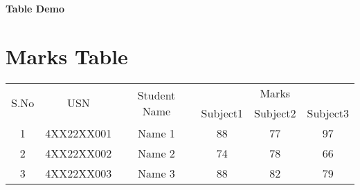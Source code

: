 \documentclass[10pt,a4paper]{article}
\begin{document}
\begin{center}
\begin{Large}
\textbf{Table Demo}
\end{Large}
\end{center}
\section*{Marks Table}
\begin{tabular}{|c|c|c|c|c|c|}
\hline 
\multirow{2}{*}{S.No} & \multirow{2}{*}{USN} & \multirow{2}{*}{Student Name} & 
\multicolumn{3}{c|}{Marks} \\
\cline{4-6} 
& & & Subject1 & Subject2 & Subject3 \\
\hline 
1 & 4XX22XX001 & Name 1 & 88 & 77 & 97 \\
\hline 
2 & 4XX22XX002 & Name 2 & 74 & 78 & 66 \\
\hline 
3 & 4XX22XX003 & Name 3 & 88 & 82 & 79 \\
\hline 
\end{tabular} 
\end{document}
